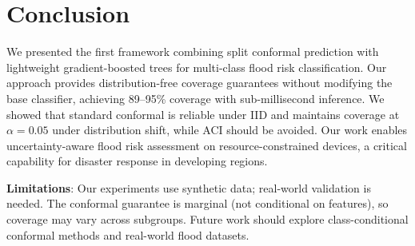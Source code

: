 \documentclass{article}
\begin{document}
\section{Conclusion}

We presented the first framework combining split conformal prediction with lightweight gradient-boosted trees for multi-class flood risk classification. Our approach provides distribution-free coverage guarantees without modifying the base classifier, achieving 89--95\% coverage with sub-millisecond inference. We showed that standard conformal is reliable under IID and maintains coverage at $\alpha=0.05$ under distribution shift, while ACI should be avoided. Our work enables uncertainty-aware flood risk assessment on resource-constrained devices, a critical capability for disaster response in developing regions.

\textbf{Limitations}: Our experiments use synthetic data; real-world validation is needed. The conformal guarantee is marginal (not conditional on features), so coverage may vary across subgroups. Future work should explore class-conditional conformal methods and real-world flood datasets.



\end{document}
